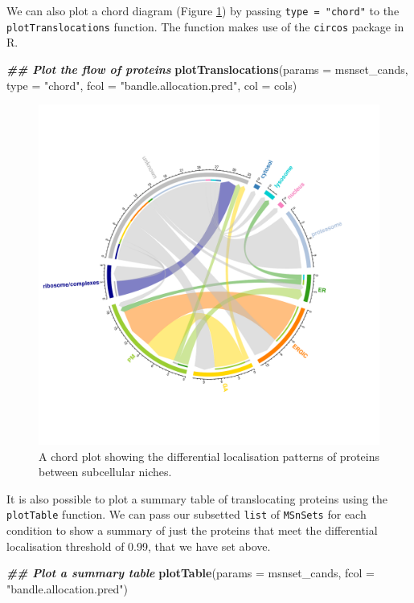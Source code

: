 \documentclass[9pt,a4paper,]{extarticle}
\newenvironment{Shaded}{\begin{snugshade}}{\end{snugshade}}
\newcommand{\AttributeTok}[1]{\textcolor[rgb]{0.13,0.29,0.53}{#1}}
\newcommand{\DocumentationTok}[1]{\textcolor[rgb]{0.56,0.35,0.01}{\textbf{\textit{#1}}}}
\newcommand{\FunctionTok}[1]{\textcolor[rgb]{0.13,0.29,0.53}{\textbf{#1}}}
\newcommand{\NormalTok}[1]{#1}
\newcommand{\StringTok}[1]{\textcolor[rgb]{0.31,0.60,0.02}{#1}}
\begin{document}
We can also plot a chord diagram (Figure \ref{fig:fig-chord}) by passing \texttt{type\ =\ "chord"} to the
\texttt{plotTranslocations} function. The function makes use of the \texttt{circos} package
in R.

\begin{Shaded}
\begin{Highlighting}[]
\DocumentationTok{\#\# Plot the flow of proteins}
\FunctionTok{plotTranslocations}\NormalTok{(}\AttributeTok{params =}\NormalTok{ msnset\_cands,}
                   \AttributeTok{type =} \StringTok{"chord"}\NormalTok{,}
                   \AttributeTok{fcol =} \StringTok{"bandle.allocation.pred"}\NormalTok{, }
                   \AttributeTok{col =}\NormalTok{ cols)}
\end{Highlighting}
\end{Shaded}

\begin{figure}[H]

{\centering \includegraphics[width=0.7\linewidth,]{figs/circo_plot} 

}

\caption{A chord plot showing the differential localisation patterns of proteins between subcellular niches.}\label{fig:fig-chord}
\end{figure}

It is also possible to plot a summary table of translocating proteins using the
\texttt{plotTable} function. We can pass our subsetted \texttt{list} of \texttt{MSnSets} for each
condition to show a summary of just the proteins that meet the differential
localisation threshold of 0.99, that we have set above.

\begin{Shaded}
\begin{Highlighting}[]
\DocumentationTok{\#\# Plot a summary table}
\FunctionTok{plotTable}\NormalTok{(}\AttributeTok{params =}\NormalTok{ msnset\_cands,}
          \AttributeTok{fcol =}  \StringTok{"bandle.allocation.pred"}\NormalTok{)}
\end{Highlighting}
\end{Shaded}
\end{document}
